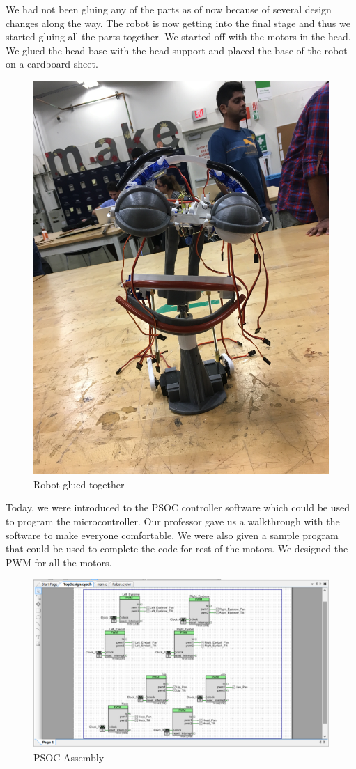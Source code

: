 \documentclass[index=totoc,hyperref,openany]{labbook} %
\begin{document}

{\let\clearpage\relax {}}

We had not been gluing any of the parts as of now because of several design changes along the way. The robot is now getting into the final stage and thus we started gluing all the parts together. We started off with the motors in the head. We glued the head base with the head support and placed the base of the robot on a cardboard sheet.

\begin{figure}[H]
\begin{center}
\includegraphics[width=0.3\linewidth, angle=-90]{robot_ready}
\end{center}
\caption{Robot glued together}
\label{fig:robot_ready}
\end{figure}


{\let\clearpage\relax {}}

Today, we were introduced to the PSOC controller software which could be used to program the microcontroller. Our professor gave us a walkthrough with the software to make everyone comfortable. We were also given a sample program that could be used to complete the code for rest of the motors. We designed the PWM for all the motors.

\begin{figure}[H]
\begin{center}
\includegraphics[width=0.8\linewidth]{psoc}
\end{center}
\caption{PSOC Assembly}
\label{fig:psoc}
\end{figure}
\end{document}
